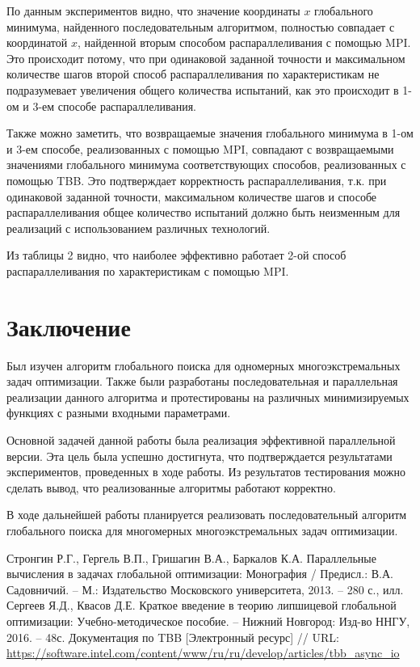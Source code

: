 \documentclass{report}
\begin{document}
По данным экспериментов видно, что значение координаты $x$ глобального минимума, найденного последовательным алгоритмом, полностью совпадает с координатой $x$, найденной вторым способом распараллеливания с помощью MPI. Это происходит потому, что при одинаковой заданной точности и максимальном количестве шагов второй способ распараллеливания по характеристикам не подразумевает увеличения общего количества испытаний, как это происходит в 1-ом и 3-ем способе распараллеливания. 

Также можно заметить, что возвращаемые значения глобального минимума в 1-ом и 3-ем способе, реализованных с помощью MPI, совпадают с возвращаемыми значениями глобального минимума соответствующих способов, реализованных с помощью TBB. Это подтверждает корректность распараллеливания, т.к. при одинаковой заданной точности, максимальном количестве шагов и способе распараллеливания общее количество испытаний должно быть неизменным для реализаций с использованием различных технологий.

Из таблицы 2 видно, что наиболее эффективно работает 2-ой способ распараллеливания по характеристикам с помощью MPI.

\newpage

\section*{Заключение}
Был изучен алгоритм глобального поиска для одномерных многоэкстремальных задач оптимизации. Также были разработаны последовательная и параллельная реализации данного алгоритма и протестированы на различных минимизируемых функциях с разными входными параметрами. 

Основной задачей данной работы была реализация эффективной параллельной версии. Эта цель была успешно достигнута, что подтверждается результатами экспериментов, проведенных в ходе работы. Из результатов тестирования можно сделать вывод, что реализованные алгоритмы работают корректно.

В ходе дальнейшей работы планируется реализовать последовательный алгоритм глобального поиска для многомерных многоэкстремальных задач оптимизации.

\newpage

\begin{thebibliography}{1}
 Стронгин Р.Г., Гергель В.П., Гришагин В.А., Баркалов К.А. Параллельные вычисления в задачах глобальной оптимизации: Монография / Предисл.:  В.А. Садовничий. – М.: Издательство Московского университета, 2013. – 280 с., илл.
 Сергеев Я.Д., Квасов Д.Е. Краткое введение в теорию липшицевой глобальной оптимизации: Учебно-методическое пособие. – Нижний Новгород: Изд-во ННГУ, 2016. – 48с.
Документация по TBB [Электронный ресурс] // URL: \url {https://software.intel.com/content/www/ru/ru/develop/articles/tbb_async_io}
\end{thebibliography}
\newpage
\end{document}
